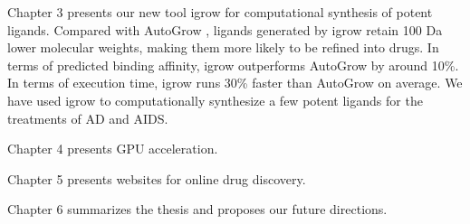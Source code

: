 Chapter 3 presents our new tool igrow for computational synthesis of potent ligands. Compared with AutoGrow \citep{466}, ligands generated by igrow retain 100 Da lower molecular weights, making them more likely to be refined into drugs. In terms of predicted binding affinity, igrow outperforms AutoGrow by around 10\%. In terms of execution time, igrow runs 30\% faster than AutoGrow on average. We have used igrow to computationally synthesize a few potent ligands for the treatments of AD and AIDS.

Chapter 4 presents GPU acceleration.

Chapter 5 presents websites for online drug discovery.

Chapter 6 summarizes the thesis and proposes our future directions.

\chapterend


